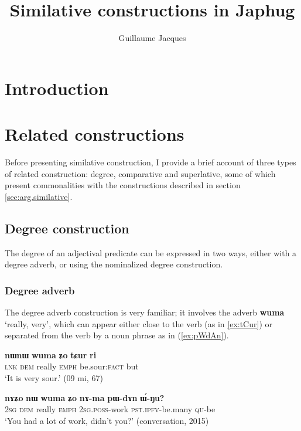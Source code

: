 \documentclass[oneside,a4paper,11pt]{article}
\newcommand{\ipa}[1]{{\phon\textbf{#1}}} %
\newcommand{\forme}[2]{\ipa{#1} `#2'}
\begin{document}
 

\title{Similative constructions in Japhug}
\author{Guillaume Jacques}
\maketitle
\linenumbers

\section*{Introduction}

\section{Related constructions}
Before presenting similative construction, I provide a brief account of three types of related construction: degree, comparative and superlative, some of which present commonalities with the constructions described in section \ref{sec:arg.similative}.

\subsection{Degree construction}
The degree of an adjectival predicate can be expressed in two ways, either with a degree adverb, or using the nominalized degree construction.

\subsubsection{Degree adverb}
The degree adverb construction is very familiar; it involves the adverb \forme{wuma}{really, very}, which can appear either close to the verb (as in \ref{ex:tCur}) or separated from the verb by a noun phrase as in (\ref{ex:pWdAn}).

\begin{exe}
\ex \label{ex:tCur}
\gll \ipa{tɕe} 	\ipa{nɯnɯ} 	\ipa{wuma} 	\ipa{ʑo} 	\ipa{tɕur} 	\ipa{ri} \\
\textsc{lnk} \textsc{dem} really  \textsc{emph} be.sour:\textsc{fact} but \\
\glt `It is very sour.' (09 mi, 67)
\end{exe}

\begin{exe}
\ex \label{ex:pWdAn}
\gll
\ipa{nɤʑo} 	\ipa{nɯ} 	\ipa{wuma} 	\ipa{ʑo} 	\ipa{nɤ-ma} 	\ipa{pɯ-dɤn} 	\ipa{ɯ́-ŋu?}  \\
\textsc{2sg} \textsc{dem} really \textsc{emph} \textsc{2sg.poss}-work \textsc{pst.ipfv}-be.many \textsc{qu}-be \\
\glt `You had a lot of work, didn't you?' (conversation, 2015)
\end{exe}
\end{document}
